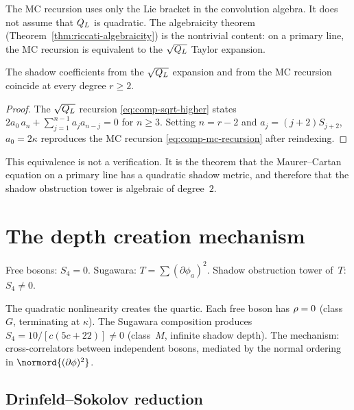 The MC recursion uses only the Lie bracket in the convolution
algebra. It does not assume that $Q_L$ is quadratic.
The algebraicity theorem
(Theorem~\ref{thm:riccati-algebraicity}) is the nontrivial
content: on a primary line, the MC recursion is
equivalent to the $\sqrt{Q_L}$ Taylor expansion.

\begin{theorem}
\label{thm:comp-alg-rec-equivalence}
\ClaimStatusProvedHere
The shadow coefficients from the $\sqrt{Q_L}$
expansion and from the MC recursion coincide at every
degree $r \geq 2$.
\end{theorem}

\begin{proof}
The $\sqrt{Q_L}$ recursion
\eqref{eq:comp-sqrt-higher} states
$2a_0\, a_n + \sum_{j=1}^{n-1} a_j a_{n-j} = 0$ for
$n \geq 3$. Setting $n = r - 2$ and $a_j = (j+2) S_{j+2}$,
$a_0 = 2\kappa$ reproduces the MC recursion
\eqref{eq:comp-mc-recursion} after reindexing.
\end{proof}

This equivalence is not a verification. It is the theorem
that the Maurer--Cartan equation on a primary line has a
quadratic shadow metric, and therefore that the shadow obstruction tower
is algebraic of degree~$2$.


\section{The depth creation mechanism}
\label{sec:comp-depth-creation}

Free bosons: $S_4 = 0$. Sugawara: $T = \sum (\partial\phi_a)^2$.
Shadow obstruction tower of~$T$: $S_4 \neq 0$.

The quadratic nonlinearity creates the quartic. Each free
boson has $\rho = 0$ (class~$G$, terminating at
$\kappa$). The Sugawara composition produces
$S_4 = 10/[c(5c+22)] \neq 0$ (class~$M$, infinite shadow depth).
The mechanism: cross-correlators between independent bosons,
mediated by the normal ordering in $\normord{(\partial\phi)^2}$.


\subsection{Drinfeld--Sokolov reduction}
\label{subsec:comp-ds-reduction}


